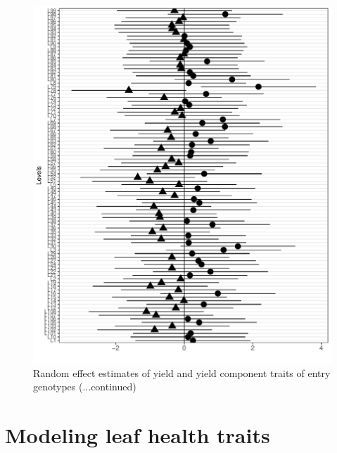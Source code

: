 \documentclass[12pt,oneside]{dukestatscithesis} %
\theoremstyle{definition}
\theoremstyle{definition}
\theoremstyle{definition}
\theoremstyle{remark}
\begin{document}
\begin{figure}

{\centering \includegraphics[width=.48\linewidth]{thesis_files/figure-latex/yield-dotplot2-1} 

}

\caption{Random effect estimates of yield and yield component traits of entry genotypes (...continued)}\label{fig:yield-dotplot2}
\end{figure}
\clearpage

\section{Modeling leaf health traits}\label{modeling-leaf-health-traits}
\end{document}
